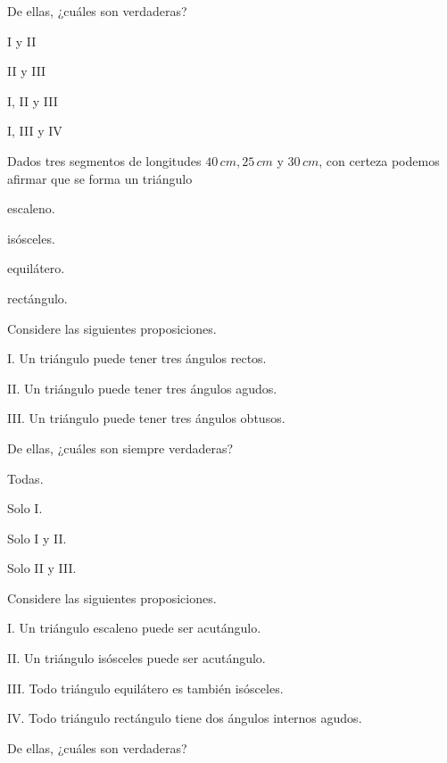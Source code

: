 \documentclass[12pt, fleqn]{article}
\begin{document}
De ellas, ¿cuáles son {\sc verdaderas}?
\benu
\item[] \opc I y II
\item[] \opc II y III
\item[] \opc I, II y III
\item[] \opc I, III y IV
\eenu
\vs

\pagebreak

\item Dados tres segmentos de longitudes $40\,cm, 25\,cm$ y $30\,cm$, con certeza podemos afirmar que se forma un triángulo \vp

\benu
\item[] \opc escaleno. \vf
\item[] \opc isósceles. \vf
\item[] \opc equilátero.\vf
\item[] \opc rectángulo.
\eenu\vp

\item  Considere las siguientes proposiciones. \vp

\begin{tcolorbox}
\bc
\benu
\item[I.] Un triángulo puede tener tres ángulos rectos.
\item[II.] Un triángulo puede tener tres ángulos agudos.
\item[III.] Un triángulo puede tener tres ángulos obtusos.
\eenu
\ec
\end{tcolorbox}

De ellas, ¿cuáles son siempre {\sc verdaderas}?
\benu
\item[] \opc Todas.
\item[] \opc Solo I.
\item[] \opc Solo I y II.
\item[] \opc Solo II y III.
\eenu
\vp

\item  Considere las siguientes proposiciones. \vp

\begin{tcolorbox}
\benu
\item[I.] Un triángulo escaleno puede ser acutángulo.
\item[II.] Un triángulo isósceles puede ser acutángulo.
\item[III.] Todo triángulo equilátero es también isósceles.
\item[IV.] Todo triángulo rectángulo tiene dos ángulos internos agudos.
\eenu
\end{tcolorbox}
\vp

De ellas, ¿cuáles son {\sc verdaderas}? \vp
\end{document}
